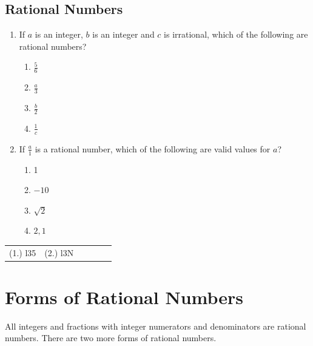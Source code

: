             \subsection{ Rational Numbers }
            \nopagebreak
            \label{m38348*id63121}\begin{enumerate}[noitemsep, label=\textbf{\arabic*}. ] 
            \label{m38348*uid9}\item If $a$ is an integer, $b$ is an integer and $c$ is irrational, which of the following are rational numbers? 
\label{m38348*id734}\begin{enumerate}[noitemsep, label=\textbf{\alph*}. ] 
            \item $\frac{5}{6}$\newline
    \item $\frac{a}{3}$\newline
    \item $\frac{b}{2}$\newline
    \item $\frac{1}{c}$\end{enumerate}
        \label{m38348*uid10}\item If $\frac{a}{1}$ is a rational number, which of the following are valid values for $a$?\label{m38348*id7432}\begin{enumerate}[noitemsep, label=\textbf{\alph*}. ] 
            \item 1\item $-10$\item $\sqrt{2}$\item $2,1$\end{enumerate}
        \end{enumerate}
\practiceinfo
\par 
 \par \begin{tabular}[h]{cccccc}
 (1.) l35  &  (2.) l3N  & \end{tabular}
    \section{ Forms of Rational Numbers}
            \nopagebreak
      \label{m38348*id63345}All integers and fractions with integer numerators and denominators are rational numbers. There are two more forms of rational numbers.\par 
\label{m38348*secfhsst!!!underscore!!!id245}
